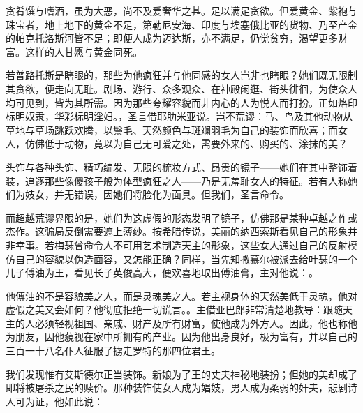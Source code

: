 贪肴馔与嗜酒，虽为大恶，尚不及爱奢华之甚。足以满足贪欲。但爱黄金、紫袍与珠宝者，地上地下的黄金不足，第勒尼安海、印度与埃塞俄比亚的货物、乃至产金的帕克托洛斯河皆不足；即便人成为迈达斯，亦不满足，仍觉贫穷，渴望更多财富。这样的人甘愿与黄金同死。\par

若普路托斯是瞎眼的，那些为他疯狂并与他同感的女人岂非也瞎眼？她们既无限制其贪欲，便走向无耻。剧场、游行、众多观众、在神殿闲逛、街头徘徊，为使众人均可见到，皆为其所需。因为那些夸耀容貌而非内心的人为悦人而打扮。正如烙印标明奴隶，华彩标明淫妇。，圣言借耶肋米亚说。岂不荒谬：马、鸟及其他动物从草地与草场跳跃欢腾，以鬃毛、天然颜色与斑斓羽毛为自己的装饰而欣喜；而女人，仿佛低于动物，竟以为自己无可爱之处，需要外来的、购买的、涂抹的美？\par

头饰与各种头饰、精巧编发、无限的梳妆方式、昂贵的镜子——她们在其中整饰着装，追逐那些像傻孩子般为体型疯狂之人——乃是无羞耻女人的特征。若有人称她们为妓女，并无错误，因她们将脸化为面具。但我们，圣言命令。\par

而超越荒谬界限的是，她们为这虚假的形态发明了镜子，仿佛那是某种卓越之作或杰作。这骗局反倒需要遮上薄纱。按希腊传说，美丽的纳西索斯看见自己的形象并非幸事。若梅瑟曾命令人不可用艺术制造天主的形象，这些女人通过自己的反射模仿自己的容貌以伪造面容，又怎能正确？同样，当先知撒慕尔被派去给叶瑟的一个儿子傅油为王，看见长子英俊高大，便欢喜地取出傅油膏，主对他说：。\par

他傅油的不是容貌美之人，而是灵魂美之人。若主视身体的天然美低于灵魂，他对虚假之美又会如何？他彻底拒绝一切谎言。。主借亚巴郎非常清楚地教导：跟随天主的人必须轻视祖国、亲戚、财产及所有财富，使他成为外方人。因此，他也称他为朋友，因他藐视在家中所拥有的产业。因为他出身良好，极为富有，并以自己的三百一十八名仆人征服了掳走罗特的那四位君王。\par

我们发现惟有艾斯德尔正当装饰。新娘为了王的丈夫神秘地装扮；但她的美却成了即将被屠杀之民的赎价。那种装饰使女人成为娼妓，男人成为柔弱的奸夫，悲剧诗人可为证，他如此说：——\par

